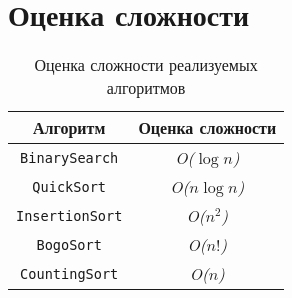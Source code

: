 \section*{Оценка сложности}

\begin{table}[H]
    \centering
    \caption{Оценка сложности реализуемых алгоритмов}
    \begin{tabular}{|c|c|}
        \hline
        Алгоритм & Оценка сложности \\ 
        \hline
        \verb|BinarySearch| & \textit{O($ \log{n} $)} \\ 
        \hline
        \verb|QuickSort| & \textit{O($ n \log{n} $)} \\ 
        \hline
        \verb|InsertionSort| & \textit{O($ n^2 $)} \\ 
        \hline
        \verb|BogoSort| & \textit{O($ n! $)} \\ 
        \hline
        \verb|CountingSort| & \textit{O($ n $)} \\
        \hline
    \end{tabular}
\end{table}


